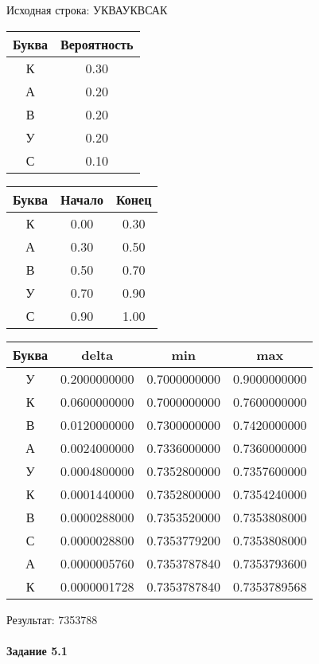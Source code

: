\documentclass[a4paper, 12pt]{article}
\begin{document}
Исходная строка: УКВАУКВСАК\
\begin{center}
 \begin{tabular}{ |c|c| } 
  \hline
     Буква & Вероятность \\ \hline
К & 0.30\\\hline
А & 0.20\\\hline
В & 0.20\\\hline
У & 0.20\\\hline
С & 0.10
\\ \hline \end{tabular}
\end{center}
\begin{center}
 \begin{tabular}{ |c|c|c| } 
  \hline
     Буква & Начало & Конец \\ \hline
К & 0.00 & 0.30\\\hline
А & 0.30 & 0.50\\\hline
В & 0.50 & 0.70\\\hline
У & 0.70 & 0.90\\\hline
С & 0.90 & 1.00
\\ \hline \end{tabular}
\end{center}
\begin{center}
 \begin{tabular}{ |c|c|c|c| } 
  \hline
     Буква & delta & min & max \\ \hline
У & 0.2000000000 & 0.7000000000 & 0.9000000000\\\hline
К & 0.0600000000 & 0.7000000000 & 0.7600000000\\\hline
В & 0.0120000000 & 0.7300000000 & 0.7420000000\\\hline
А & 0.0024000000 & 0.7336000000 & 0.7360000000\\\hline
У & 0.0004800000 & 0.7352800000 & 0.7357600000\\\hline
К & 0.0001440000 & 0.7352800000 & 0.7354240000\\\hline
В & 0.0000288000 & 0.7353520000 & 0.7353808000\\\hline
С & 0.0000028800 & 0.7353779200 & 0.7353808000\\\hline
А & 0.0000005760 & 0.7353787840 & 0.7353793600\\\hline
К & 0.0000001728 & 0.7353787840 & 0.7353789568
\\ \hline \end{tabular}
\end{center}
Результат: 7353788
\pagebreak
\paragraph{Задание 5.1 \\
}
\end{document}
